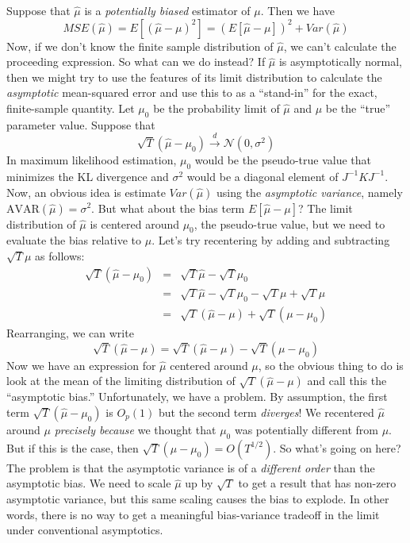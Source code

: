 \documentclass[12pt]{article}
\theoremstyle{definition}
\begin{document}
Suppose that $\widehat{\mu}$ is a \emph{potentially biased} estimator of $\mu$. Then we have 
	$$MSE(\widehat{\mu}) = E[(\widehat{\mu} - \mu)^2] = \left(E[\widehat{\mu} - \mu]\right)^2 + Var(\widehat{\mu})$$
Now, if we don't know the finite sample distribution of $\widehat{\mu}$, we can't calculate the proceeding expression. So what can we do instead? If $\widehat{\mu}$ is asymptotically normal, then we might try to use the features of its limit distribution to calculate the \emph{asymptotic} mean-squared error and use this to as a ``stand-in'' for the exact, finite-sample quantity. Let $\mu_0$ be the probability limit of $\widehat{\mu}$ and $\mu$ be the ``true'' parameter value. Suppose that 
	$$\sqrt{T}\left(\widehat{\mu} - \mu_0 \right) \overset{d}{\rightarrow} \mathcal{N}(0,\sigma^2)$$
In maximum likelihood estimation, $\mu_0$ would be the pseudo-true value that minimizes the KL divergence and $\sigma^2$ would be a diagonal element of $J^{-1}KJ^{-1}$. Now, an obvious idea is estimate $Var(\widehat{\mu})$ using the \emph{asymptotic variance}, namely $\mbox{AVAR}(\widehat{\mu}) = \sigma^2$. But what about the bias term $E[\widehat{\mu} - \mu]$? The limit distribution of $\widehat{\mu}$ is centered around $\mu_0$, the pseudo-true value, but we need to evaluate the bias relative to $\mu$. Let's try recentering by adding and subtracting $\sqrt{T}\mu$ as follows:
\begin{eqnarray*}
	\sqrt{T}\left(\widehat{\mu} - \mu_0 \right) &=& \sqrt{T}\widehat{\mu} - \sqrt{T} \mu_0\\
	&=& \sqrt{T}\widehat{\mu} - \sqrt{T} \mu_0 - \sqrt{T} \mu + \sqrt{T} \mu\\
	&=& \sqrt{T}\left( \widehat{\mu} - \mu\right) + \sqrt{T}\left(\mu - \mu_0 \right)
\end{eqnarray*}
Rearranging, we can write
	$$\sqrt{T}\left( \widehat{\mu} - \mu\right) = \sqrt{T}\left(\widehat{\mu} - \mu \right) - \sqrt{T}\left(\mu - \mu_0 \right)$$
Now we have an expression for $\widehat{\mu}$ centered around $\mu$, so the obvious thing to do is look at the mean of the limiting distribution of $\sqrt{T}\left( \widehat{\mu} - \mu\right) $ and call this the ``asymptotic bias.'' Unfortunately, we have a problem. By assumption, the first term $\sqrt{T}\left(\widehat{\mu} - \mu_0 \right)$ is $O_p(1)$ but the second term \emph{diverges}! We recentered $\widehat{\mu}$ around $\mu$ \emph{precisely because} we thought that $\mu_0$ was potentially different from $\mu$. But if this is the case, then $ \sqrt{T}\left(\mu - \mu_0 \right) = O(T^{1/2})$. So what's going on here? The problem is that the asymptotic variance is of a \emph{different order} than the asymptotic bias. We need to scale $\widehat{\mu}$ up by $\sqrt{T}$ to get a result that has non-zero asymptotic variance, but this same scaling causes the bias to explode. In other words, there is no way to get a meaningful bias-variance tradeoff in the limit under conventional asymptotics.
\end{document}
